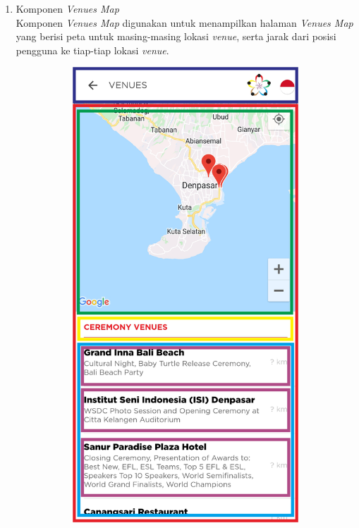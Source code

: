 \begin{enumerate}
\begin{enumerate}
\end{enumerate}
	
	\item Komponen \textit{Venues Map} \\
	Komponen \textit{Venues Map} digunakan untuk menampilkan halaman \textit{Venues Map} yang berisi peta untuk masing-masing lokasi \textit{venue}, serta jarak dari posisi pengguna ke tiap-tiap lokasi \textit{venue}. 
	\begin{figure}[H]
    	\centering
     	\begin{subfigure}[b]{0.43\textwidth}
        	\centering
         	\includegraphics[scale=0.465]{Gambar/VenueMapPageWireframe.png}

\end{subfigure}
\end{figure}
\end{enumerate}
